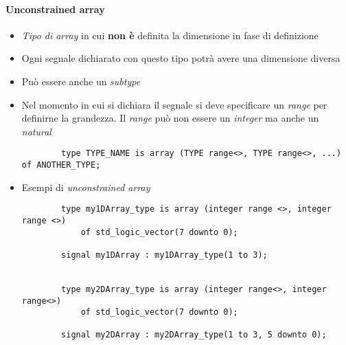 \documentclass{article}
\begin{document}
\paragraph{Unconstrained array}
\begin{itemize}
  \item \textit{Tipo di array} in cui \textbf{non è} definita la dimensione in fase di definizione
  \item Ogni segnale dichiarato con questo tipo potrà avere una dimensione diversa
  \item Può essere anche un \textit{subtype}
  \item Nel momento in cui si dichiara il segnale si deve specificare un \textit{range} per definirne la grandezza. Il \textit{range} può non essere un \textit{integer} ma anche un \textit{natural}
        \begin{verbatim}
	    type TYPE_NAME is array (TYPE range<>, TYPE range<>, ...) of ANOTHER_TYPE;
	\end{verbatim}
  \item Esempi di \textit{unconstrained array}
        \begin{verbatim}
	    type my1DArray_type is array (integer range <>, integer range <>)
	        of std_logic_vector(7 downto 0);

	    signal my1DArray : my1DArray_type(1 to 3);


	    type my2DArray_type is array (integer range<>, integer range<>)
    	    of std_logic_vector(7 downto 0);

	    signal my2DArray : my2DArray_type(1 to 3, 5 downto 0);
	\end{verbatim}
\end{itemize}
\end{document}
